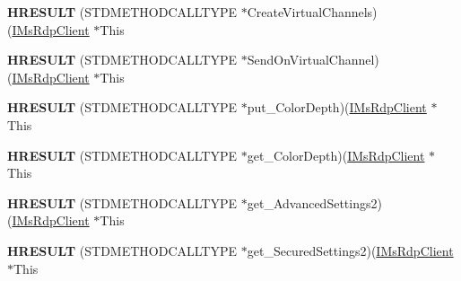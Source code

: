 \begin{DoxyCompactItemize}
\mbox{\label{struct_m_s_t_s_c_lib_1_1_i_ms_rdp_client_vtbl_a590a229508719ccb47222a2e85df9c61}} 
{\bfseries H\+R\+E\+S\+U\+LT} (S\+T\+D\+M\+E\+T\+H\+O\+D\+C\+A\+L\+L\+T\+Y\+PE $\ast$Create\+Virtual\+Channels)(\hyperlink{interface_m_s_t_s_c_lib_1_1_i_ms_rdp_client}{I\+Ms\+Rdp\+Client} $\ast$This
\item 
\mbox{\label{struct_m_s_t_s_c_lib_1_1_i_ms_rdp_client_vtbl_a1351e856207762743bd3cedf40ee2cdc}} 
{\bfseries H\+R\+E\+S\+U\+LT} (S\+T\+D\+M\+E\+T\+H\+O\+D\+C\+A\+L\+L\+T\+Y\+PE $\ast$Send\+On\+Virtual\+Channel)(\hyperlink{interface_m_s_t_s_c_lib_1_1_i_ms_rdp_client}{I\+Ms\+Rdp\+Client} $\ast$This
\item 
\mbox{\label{struct_m_s_t_s_c_lib_1_1_i_ms_rdp_client_vtbl_aa58a17a37dfa892cfffec86202a9e9d0}} 
{\bfseries H\+R\+E\+S\+U\+LT} (S\+T\+D\+M\+E\+T\+H\+O\+D\+C\+A\+L\+L\+T\+Y\+PE $\ast$put\+\_\+\+Color\+Depth)(\hyperlink{interface_m_s_t_s_c_lib_1_1_i_ms_rdp_client}{I\+Ms\+Rdp\+Client} $\ast$This
\item 
\mbox{\label{struct_m_s_t_s_c_lib_1_1_i_ms_rdp_client_vtbl_a6ef4315108c226748b319bf11161456c}} 
{\bfseries H\+R\+E\+S\+U\+LT} (S\+T\+D\+M\+E\+T\+H\+O\+D\+C\+A\+L\+L\+T\+Y\+PE $\ast$get\+\_\+\+Color\+Depth)(\hyperlink{interface_m_s_t_s_c_lib_1_1_i_ms_rdp_client}{I\+Ms\+Rdp\+Client} $\ast$This
\item 
\mbox{\label{struct_m_s_t_s_c_lib_1_1_i_ms_rdp_client_vtbl_a0114d46a2ea07ee1e5edbe8e393641d3}} 
{\bfseries H\+R\+E\+S\+U\+LT} (S\+T\+D\+M\+E\+T\+H\+O\+D\+C\+A\+L\+L\+T\+Y\+PE $\ast$get\+\_\+\+Advanced\+Settings2)(\hyperlink{interface_m_s_t_s_c_lib_1_1_i_ms_rdp_client}{I\+Ms\+Rdp\+Client} $\ast$This
\item 
\mbox{\label{struct_m_s_t_s_c_lib_1_1_i_ms_rdp_client_vtbl_a7a30feb1f864a84692c7b0e6b459e97f}} 
{\bfseries H\+R\+E\+S\+U\+LT} (S\+T\+D\+M\+E\+T\+H\+O\+D\+C\+A\+L\+L\+T\+Y\+PE $\ast$get\+\_\+\+Secured\+Settings2)(\hyperlink{interface_m_s_t_s_c_lib_1_1_i_ms_rdp_client}{I\+Ms\+Rdp\+Client} $\ast$This
\item 

\end{DoxyCompactItemize}
